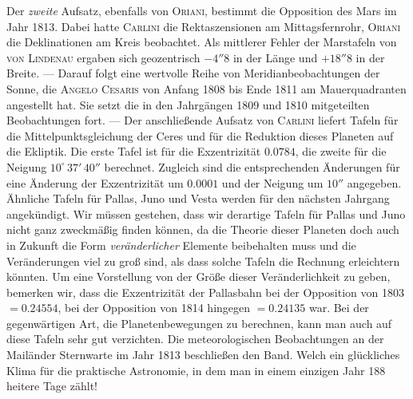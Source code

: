 Der \emph{zweite} Aufsatz, ebenfalls von \textsc{Oriani}, bestimmt die Opposition des Mars im Jahr 1813. Dabei hatte \textsc{Carlini} die Rektaszensionen am Mittagsfernrohr, \textsc{Oriani} die Deklinationen am Kreis beobachtet. Als mittlerer Fehler der Marstafeln von \textsc{von Lindenau} ergaben sich geozentrisch $-4''8$ in der Länge und $+18''8$ in der Breite. --- Darauf folgt eine wertvolle Reihe von Meridianbeobachtungen der Sonne, die \textsc{Angelo Cesaris} von Anfang 1808 bis Ende 1811 am Mauerquadranten angestellt hat. Sie setzt die in den Jahrgängen 1809 und 1810 mitgeteilten Beobachtungen fort. --- Der anschließende Aufsatz von \textsc{Carlini} liefert Tafeln für die Mittelpunktsgleichung der Ceres und für die Reduktion dieses Planeten auf die Ekliptik. Die erste Tafel ist für die Exzentrizität $0.0784$, die zweite für die Neigung $10^\circ\,37'\,40''$ berechnet. Zugleich sind die entsprechenden Änderungen für eine Änderung der Exzentrizität um $0.0001$ und der Neigung um $10''$ angegeben. Ähnliche Tafeln für Pallas, Juno und Vesta werden für den nächsten Jahrgang angekündigt. Wir müssen gestehen, dass wir derartige Tafeln für Pallas und Juno nicht ganz zweckmäßig finden können, da die Theorie dieser Planeten doch auch in Zukunft die Form \emph{veränderlicher} Elemente beibehalten muss und die Veränderungen viel zu groß sind, als dass solche Tafeln die Rechnung erleichtern könnten. Um eine Vorstellung von der Größe dieser Veränderlichkeit zu geben, bemerken wir, dass die Exzentrizität der Pallasbahn bei der Opposition von 1803 $=0.24554$, bei der Opposition von 1814 hingegen $=0.24135$ war. Bei der gegenwärtigen Art, die Planetenbewegungen zu berechnen, kann man auch auf diese Tafeln sehr gut verzichten. Die meteorologischen Beobachtungen an der Mailänder Sternwarte im Jahr 1813 beschließen den Band. Welch ein glückliches Klima für die praktische Astronomie, in dem man in einem einzigen Jahr 188 heitere Tage zählt!
